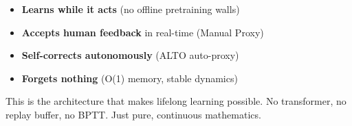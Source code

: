 \documentclass[
  11pt,
  a4paper,
]{article}
\providecommand{\tightlist}{%
  \setlength{\itemsep}{0pt}\setlength{\parskip}{0pt}}
\begin{document}
\begin{itemize}
\tightlist
\item
  \textbf{Learns while it acts} (no offline pretraining walls)
\item
  \textbf{Accepts human feedback} in real-time (Manual Proxy)
\item
  \textbf{Self-corrects autonomously} (ALTO auto-proxy)
\item
  \textbf{Forgets nothing} (O(1) memory, stable dynamics)
\end{itemize}

This is the architecture that makes lifelong learning possible. No
transformer, no replay buffer, no BPTT. Just pure, continuous
mathematics.
\end{document}
